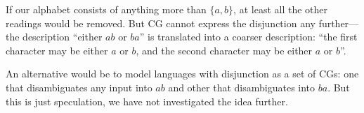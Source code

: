 \documentclass[11pt]{article}
\def\t#1{\texttt{#1}}
\def\maxAmbFSA#1{$\langle \Sigma,S \rangle_#1$}
\begin{document}
If our alphabet consists of anything more than $\{a,b\}$, at least all the other 
readings would be removed. But CG cannot express the disjunction any further---the 
description ``either $ab$ or $ba$'' is translated into a coarser description:
``the first character may be either $a$ or $b$, and the second character may be either $a$ or $b$''.

An alternative would be to model languages with disjunction as a set of CGs: 
one that disambiguates any input into $ab$ and other that disambiguates 
into $ba$. But this is just speculation, we have not investigated the idea further. 





\end{document}
